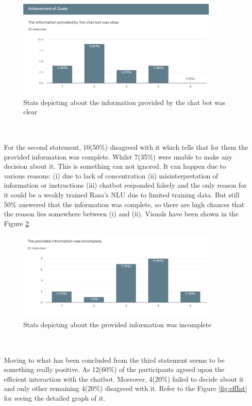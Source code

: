 \begin{figure}[!h]
    \centering
    \includegraphics[width=0.9\textwidth]{img/Clear_Info.PNG}
    \caption{Stats depicting about the information provided by the chat bot was clear}
    \label{fig:clearInfo}
\end{figure}
\\~\\
For the second statement, 10(50\%) disagreed with it which tells that for them the provided information was complete. Whilst 7(35\%) were unable to make any decision about it. This is something can not ignored. It can happen due to various reasons: (i) due to lack of concentration (ii) misinterpretation of information or instructions (iii) chatbot responded falsely and the only reason for it could be a weakly trained Rasa's NLU due to limited training data. But still 50\% answered that the information was complete, so there are high chances that the reason lies somewhere between (i) and (ii). Visuals have been shown in the Figure \ref{fig:incompInfo}.

\begin{figure}[!h]
    \centering
    \includegraphics[width=0.9\textwidth]{img/Incomp_Info.PNG}
    \caption{Stats depicting about the provided information was incomplete}
    \label{fig:incompInfo}
\end{figure}
\\~\\
Moving to what has been concluded from the third statement seems to be something really positive. As 12(60\%) of the participants agreed upon the efficient interaction with the chatbot. Moreover, 4(20\%) failed to decide about it and only other remaining 4(20\%) disagreed with it. Refer to the Figure \ref{fig:effInt} for seeing the detailed graph of it.

